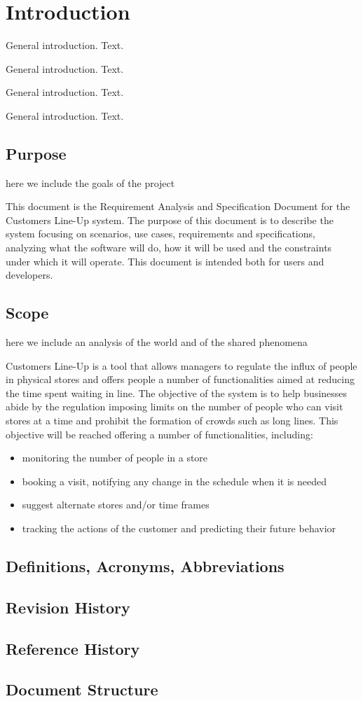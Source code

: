\section{Introduction}\label{sec:intro}

General introduction. Text.

General introduction. Text.

General introduction. Text.

General introduction. Text.
\subsection{Purpose}
here we include the goals of the project

This document is the Requirement Analysis and Specification Document for the Customers Line-Up system.
The purpose of this document is to describe the system focusing on scenarios, use cases, requirements and specifications,
analyzing what the software will do, how it will be used and the constraints under which it will operate.
This document is intended both for users and developers.

\subsection{Scope}
here we include an analysis of the world and of the shared phenomena

Customers Line-Up is a tool that allows managers to regulate the influx of people in physical stores and offers
people a number of functionalities aimed at reducing the time spent waiting in line.
The objective of the system is to help businesses abide by the regulation imposing limits on the number of people
who can visit stores at a time and prohibit the formation of crowds such as long lines.
This objective will be reached offering a number of functionalities, including:
\begin{itemize}
    \item monitoring the number of people in a store
    \item booking a visit, notifying any change in the schedule when it is needed
    \item suggest alternate stores and/or time frames
    \item tracking the actions of the customer and predicting their future behavior
\end{itemize}

\subsection{Definitions, Acronyms, Abbreviations}
\subsection{Revision History}
\subsection{Reference History}
\subsection{Document Structure}